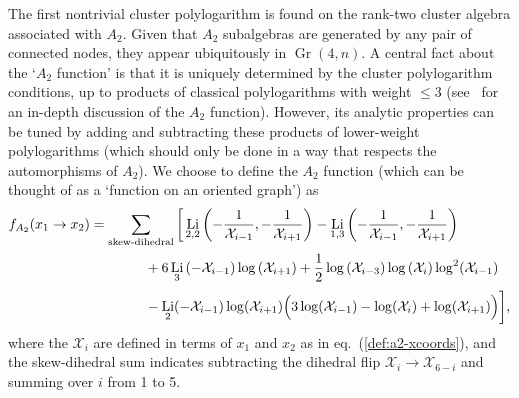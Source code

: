 \documentclass[12pt]{article}
\DeclareMathOperator{\Gr}{Gr}
\DeclareMathOperator{\Li}{Li}
\def\x{\mathcal{X}}
\begin{document}
The first nontrivial cluster polylogarithm is found on the rank-two cluster algebra associated with $A_2$. Given that $A_2$ subalgebras are generated by any pair of connected nodes, they appear ubiquitously in $\Gr(4,n)$. A central fact about the `$A_2$ function' is that it is uniquely determined by the cluster polylogarithm conditions, up to products of classical polylogarithms with weight $\le3$ (see~\cite{Golden:2014xqa} for an in-depth discussion of the $A_2$ function). However, its analytic properties can be tuned by adding and subtracting these products of lower-weight polylogarithms (which should only be done in a way that respects the automorphisms of $A_2$). We choose to define the $A_2$ function (which can be thought of as a `function on an oriented graph') as
\begin{align}\label{def:a2-function}
	f_{A_2}(x_1 \to x_2)  &= \sum_{\text{skew-dihedral}} \bigg[ \Li_{2,2}\left(-\frac{1}{\x_{i-1}},-\frac{1}{\x_{i+1}}\right) - \Li_{1,3}\left(-\frac{1}{\x_{i-1}},-\frac{1}{\x_{i+1}}\right)  \\
	&\hspace{1.4cm} +6 \Li_3\left(-\x_{i-1}\right) \log \left(\x_{i+1}\right) +\frac{1}{2} \log \left(\x_{i-3}\right) \log \left(\x_i\right) \log^2\! \left(\x_{i-1}\right) {\color{white} \bigg|} \nonumber \\
	&\hspace{1.4cm} -\Li_2(-\x_{i-1}) \log (\x_{i+1}) \Big(3 \log (\x_{i-1})-\log (\x_i)+\log (\x_{i+1})\Big) \bigg], \nonumber
\end{align}
where the $\x_i$ are defined in terms of $x_1$ and $x_2$ as in eq.~(\ref{def:a2-xcoords}), and the skew-dihedral sum indicates subtracting the dihedral flip $\x_i \to \x_{6-i}$ and summing over $i$ from 1 to 5. 
\end{document}
